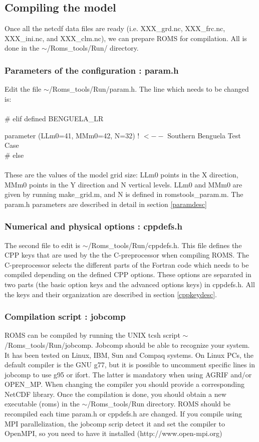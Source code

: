 \subsection{Compiling the model}

Once all the netcdf data files are ready (i.e. XXX\_grd.nc,
XXX\_frc.nc, XXX\_ini.nc, and XXX\_clm.nc), we can prepare ROMS for
compilation. All is done in the $\sim$/Roms\_tools/Run/ directory.

\subsubsection{Parameters of the configuration : param.h}
Edit the file $\sim$/Roms\_tools/Run/param.h.
The line which needs to be changed is:\\\\
\# elif defined BENGUELA\_LR

parameter (LLm0=41, MMm0=42, N=32)  ! $<--$ Southern Benguela Test Case\\
\#  else\\
\\
These are the values of the model grid size: LLm0 points in the X direction, MMm0
points in the Y direction and N vertical levels.  LLm0 and MMm0 are given by running
make\_grid.m, and N is defined in romstools\_param.m. The param.h parameters are
described in detail in section \ref{paramdesc}

\subsubsection{Numerical and physical options : cppdefs.h}
The second file to edit is $\sim$/Roms\_tools/Run/cppdefs.h.  This file defines the
CPP keys that are used by the the C-preprocessor when compiling ROMS. The
C-preprocessor selects the different parts of the Fortran code which needs to be
compiled depending on the defined CPP options. These options are separated in two
parts (the basic option keys and the advanced options keys) in cppdefs.h. All the
keys and their organization are described in section \ref{cppkeydesc}. \\

\subsubsection{Compilation script :  jobcomp}
ROMS can be compiled by running the UNIX tcsh script $\sim$/Roms\_tools/Run/jobcomp.
Jobcomp should be able to recognize your system. It has been tested on Linux, IBM,
Sun and Compaq systems. On Linux PCs, the default compiler is the GNU g77, but it is
possible to uncomment specific lines in jobcomp to use g95 or ifort.  The latter is
mandatory when using AGRIF and/or OPEN\_MP.  When changing the compiler you should
provide a corresponding NetCDF library.  Once the compilation is done, you should
obtain a new executable (roms) in the $\sim$/Roms\_tools/Run directory.  ROMS should
be recompiled each time param.h or cppdefs.h are changed.  If you compile using MPI
parallelization, the jobcomp scrip detect it and set the compiler to OpenMPI, so you
need to have it installed (http://www.open-mpi.org)

